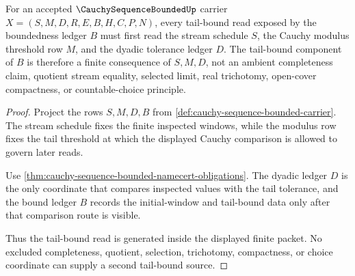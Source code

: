 \begin{theorem}\label{thm:cauchy-sequence-bounded-modulus-tail-bound}
For an accepted $\CauchySequenceBoundedUp$ carrier $X=(S,M,D,R,E,B,H,C,P,N)$, every tail-bound read exposed by the boundedness ledger $B$ must first read the stream schedule $S$, the Cauchy modulus threshold row $M$, and the dyadic tolerance ledger $D$. The tail-bound component of $B$ is therefore a finite consequence of $S,M,D$, not an ambient completeness claim, quotient stream equality, selected limit, real trichotomy, open-cover compactness, or countable-choice principle.
\end{theorem}
\begin{proof}
Project the rows $S,M,D,B$ from \autoref{def:cauchy-sequence-bounded-carrier}. The stream schedule fixes the finite inspected windows, while the modulus row fixes the tail threshold at which the displayed Cauchy comparison is allowed to govern later reads.

Use \autoref{thm:cauchy-sequence-bounded-namecert-obligations}. The dyadic ledger $D$ is the only coordinate that compares inspected values with the tail tolerance, and the bound ledger $B$ records the initial-window and tail-bound data only after that comparison route is visible.

Thus the tail-bound read is generated inside the displayed finite packet. No excluded completeness, quotient, selection, trichotomy, compactness, or choice coordinate can supply a second tail-bound source.
\end{proof}

